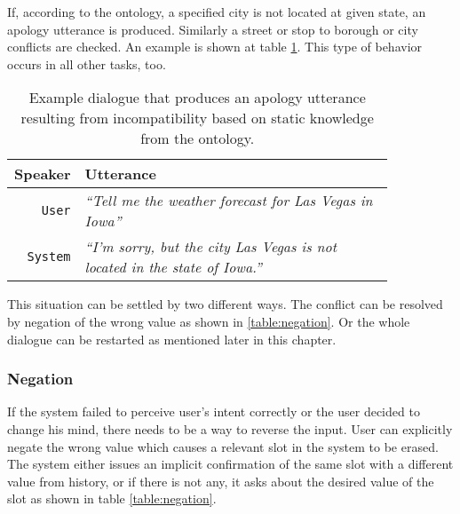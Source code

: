 If, according to the ontology, a specified city is not located at given state, an apology utterance is produced.
Similarly a street or stop to borough or city conflicts are checked.
An example is shown at table \ref{table:conflict}.
This type of behavior occurs in all other tasks, too.

\begin{table}[h]
\centering
\begin{tabular}{ | r | p{0.85\linewidth} | } \hline
	\textbf{Speaker} & \textbf{Utterance} \\ \hline
	\texttt{User} & \textit{``Tell me the weather forecast for Las Vegas in Iowa''} \\ \hline
	\texttt{System} & \textit{``I'm sorry, but the city Las Vegas is not located in the state of Iowa.''} \\ \hline
\end{tabular}
\caption[Conflict example of incompatible waypoints]{Example dialogue that produces an apology utterance resulting from incompatibility based on static knowledge from the ontology.}
\label{table:conflict}
\end{table}

This situation can be settled by two different ways.
The conflict can be resolved by negation of the wrong value as shown in \ref{table:negation}.
Or the whole dialogue can be restarted as mentioned later in this chapter.

\subsubsection{Negation}

If the system failed to perceive user's intent correctly or the user decided to change his mind, there needs to be a way to reverse the input.
User can explicitly negate the wrong value which causes a relevant slot in the system to be erased.
The system either issues an implicit confirmation of the same slot with a different value from history, or if there is not any, it asks about the desired value of the slot as shown in table \ref{table:negation}.

